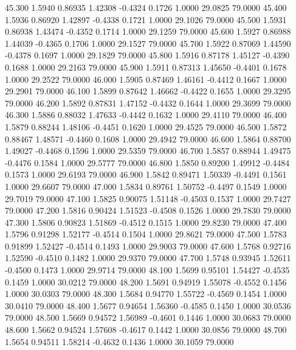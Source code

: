   45.300   1.5940   0.86935   1.42308  -0.4324   0.1726   1.0000  29.0825  79.0000
  45.400   1.5936   0.86920   1.42897  -0.4338   0.1721   1.0000  29.1026  79.0000
  45.500   1.5931   0.86938   1.43474  -0.4352   0.1714   1.0000  29.1259  79.0000
  45.600   1.5927   0.86988   1.44039  -0.4365   0.1706   1.0000  29.1527  79.0000
  45.700   1.5922   0.87069   1.44590  -0.4378   0.1697   1.0000  29.1829  79.0000
  45.800   1.5916   0.87178   1.45127  -0.4390   0.1688   1.0000  29.2163  79.0000
  45.900   1.5911   0.87313   1.45650  -0.4401   0.1678   1.0000  29.2522  79.0000
  46.000   1.5905   0.87469   1.46161  -0.4412   0.1667   1.0000  29.2901  79.0000
  46.100   1.5899   0.87642   1.46662  -0.4422   0.1655   1.0000  29.3295  79.0000
  46.200   1.5892   0.87831   1.47152  -0.4432   0.1644   1.0000  29.3699  79.0000
  46.300   1.5886   0.88032   1.47633  -0.4442   0.1632   1.0000  29.4110  79.0000
  46.400   1.5879   0.88244   1.48106  -0.4451   0.1620   1.0000  29.4525  79.0000
  46.500   1.5872   0.88467   1.48571  -0.4460   0.1608   1.0000  29.4942  79.0000
  46.600   1.5864   0.88700   1.49027  -0.4468   0.1596   1.0000  29.5359  79.0000
  46.700   1.5857   0.88944   1.49475  -0.4476   0.1584   1.0000  29.5777  79.0000
  46.800   1.5850   0.89200   1.49912  -0.4484   0.1573   1.0000  29.6193  79.0000
  46.900   1.5842   0.89471   1.50339  -0.4491   0.1561   1.0000  29.6607  79.0000
  47.000   1.5834   0.89761   1.50752  -0.4497   0.1549   1.0000  29.7019  79.0000
  47.100   1.5825   0.90075   1.51148  -0.4503   0.1537   1.0000  29.7427  79.0000
  47.200   1.5816   0.90424   1.51523  -0.4508   0.1526   1.0000  29.7830  79.0000
  47.300   1.5806   0.90823   1.51869  -0.4512   0.1515   1.0000  29.8230  79.0000
  47.400   1.5796   0.91298   1.52177  -0.4514   0.1504   1.0000  29.8621  79.0000
  47.500   1.5783   0.91899   1.52427  -0.4514   0.1493   1.0000  29.9003  79.0000
  47.600   1.5768   0.92716   1.52590  -0.4510   0.1482   1.0000  29.9370  79.0000
  47.700   1.5748   0.93945   1.52611  -0.4500   0.1473   1.0000  29.9714  79.0000
  48.100   1.5699   0.95101   1.54427  -0.4535   0.1459   1.0000  30.0212  79.0000
  48.200   1.5691   0.94919   1.55078  -0.4552   0.1456   1.0000  30.0303  79.0000
  48.300   1.5684   0.94770   1.55722  -0.4569   0.1454   1.0000  30.0410  79.0000
  48.400   1.5677   0.94654   1.56360  -0.4585   0.1450   1.0000  30.0536  79.0000
  48.500   1.5669   0.94572   1.56989  -0.4601   0.1446   1.0000  30.0683  79.0000
  48.600   1.5662   0.94524   1.57608  -0.4617   0.1442   1.0000  30.0856  79.0000
  48.700   1.5654   0.94511   1.58214  -0.4632   0.1436   1.0000  30.1059  79.0000
